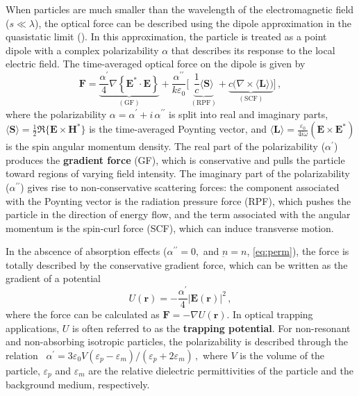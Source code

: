 When particles are much smaller than the wavelength of the electromagnetic field 
($s \ll \lambda$), the optical force can be described using the dipole approximation 
in the quasistatic limit (). In this approximation, the 
particle is treated as a point dipole with a complex polarizability $\alpha$ that 
describes its response to the local electric field. 
The time-averaged optical force on the dipole is given by~\cite{novotny}
\begin{equation}\label{eq:dip_force}
    \mathbf{F} = 
    \underbrace{\frac{\alpha^{\prime}}{4} \nabla\left\{ \mathbf{E}^* \cdot \mathbf{E} \right\}}_{(\text{GF})}
    + \frac{\alpha^{\prime\prime}}{k \varepsilon_0}
    \Big[\, \underbrace{\frac{1}{c} \langle \mathbf{S} \rangle}_{(\text{RPF})}
    + \underbrace{c \big( \nabla \times \langle \mathbf{L} \rangle \big)}_{(\text{SCF})} \Big]\,,
\end{equation}
where the polarizability $\alpha = \alpha^\prime + i\,\alpha^{\prime\prime}$ is split into 
real and imaginary parts, $\langle \mathbf{S} \rangle = \frac{1}{2} \Re\{\mathbf{E} \times 
\mathbf{H}^*\}$ is the time-averaged Poynting vector, and 
$\langle \mathbf{L} \rangle = \frac{\varepsilon_0}{4 i \omega} (\mathbf{E} \times \mathbf{E}^*)$ 
is the spin angular momentum density. The real part of the polarizability ($\alpha^\prime$) produces the 
\textbf{gradient force} (GF), which is conservative and pulls the particle toward regions 
of varying field intensity. The imaginary part of the polarizability ($\alpha^{\prime\prime}$) 
gives rise to non-conservative scattering forces: the component associated with the Poynting vector is 
the radiation pressure force (RPF), which pushes the particle in the direction of energy 
flow, and the term associated with the angular momentum is the spin-curl force (SCF), 
which can induce transverse motion. 

In the abscence of absorption effects ($\alpha^{\prime \prime}=0,$ and $\underbar{n}=n$, \eqref{eq:perm}), the force is totally described 
by the conservative gradient force, which can be written as the gradient 
of a potential
\begin{equation}
    U (\mathbf{r}) = -\frac{\alpha^{\prime}}{4} \left|\mathbf{E}(\mathbf{r})\right|^2\,,
\end{equation}
where the force can be calculated as $\mathbf{F} = -\nabla U(\mathbf{r})$. In optical trapping applications, $U$ is often referred to as the \textbf{trapping potential}.
For non-resonant and non-absorbing isotropic particles, the polarizability is 
described through the relation~\cite{BornWolf:1999:Book} 
    $\alpha^{\prime}= 3 \varepsilon_0 V (\varepsilon_p-\varepsilon_m)/(\varepsilon_p+2 \varepsilon_m)\,,$
where $V$ is the volume of the particle, $\varepsilon_p$ and $\varepsilon_m$ are the relative
dielectric permittivities of the particle and the background medium, respectively. 

